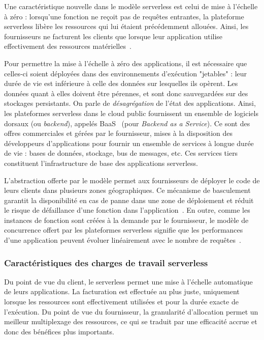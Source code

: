 Une caractéristique nouvelle dans le modèle serverless est celui de mise à l'échelle à zéro : lorsqu'une fonction ne reçoit pas de requêtes entrantes, la plateforme serverless libère les ressources qui lui étaient précédemment allouées. Ainsi, les fournisseurs ne facturent les clients que lorsque leur application utilise effectivement des ressources matérielles~\cite{hellersteinServerlessComputingOne2019}.

Pour permettre la mise à l'échelle à zéro des applications, il est nécessaire que celles-ci soient déployées dans des environnements d'exécution "jetables" : leur durée de vie est inférieure à celle des données sur lesquelles ils opèrent. Les données quant à elles doivent être pérennes, et sont donc sauvegardées sur des stockages persistants. On parle de \textit{désagrégation} de l'état des applications. Ainsi, les plateformes serverless dans le cloud public fournissent un ensemble de logiciels dorsaux (ou \textit{backend}), appelés \gls{BaaS}~\cite{mikeroberts2018serverless} (pour \textit{Backend as a Service}). Ce sont des offres commerciales et gérées par le fournisseur, mises à la disposition des développeurs d'applications pour fournir un ensemble de services à longue durée de vie : bases de données, stockage, bus de messages, etc. Ces services tiers constituent l'infrastructure de base des applications serverless.

L'abstraction offerte par le modèle permet aux fournisseurs de déployer le code de leurs clients dans plusieurs zones géographiques. Ce mécanisme de basculement garantit la disponibilité en cas de panne dans une zone de déploiement et réduit le risque de défaillance d'une fonction dans l'application~\cite{taibiPatternsServerlessFunctions2020}. En outre, comme les instances de fonction sont créées à la demande par le fournisseur, le modèle de concurrence offert par les plateformes serverless signifie que les performances d'une application peuvent évoluer linéairement avec le nombre de requêtes~\cite{mcgrathServerlessComputingDesign2017}.

\subsubsection{Caractéristiques des charges de travail serverless}

Du point de vue du client, le serverless permet une mise à l'échelle automatique de leurs applications. La facturation est effectuée au plus juste, uniquement lorsque les ressources sont effectivement utilisées et pour la durée exacte de l'exécution. Du point de vue du fournisseur, la granularité d'allocation permet un meilleur multiplexage des ressources, ce qui se traduit par une efficacité accrue et donc des bénéfices plus importants.


